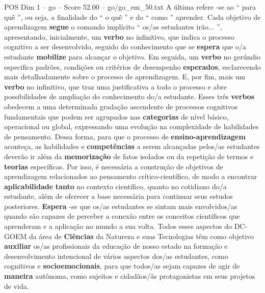 \begin{textsample}{POS Dim 1 – go – Score 52.00 – go/go\_em\_50.txt}
A última refere -se ao “ para quê ”, ou seja, a finalidade do “ o quê ” e do “ como ” aprender.
Cada objetivo de aprendizagem \textbf{segue} o comando implícito “ os/as estudantes irão... ”, apresentando, inicialmente, um \textbf{verbo} no infinitivo, que indica o processo cognitivo a ser desenvolvido, seguido do conhecimento que se \textbf{espera} que o/a estudante \textbf{mobilize} para alcançar o objetivo.
Em seguida, um \textbf{verbo} no gerúndio especifica padrões, condições ou critérios de desempenho \textbf{esperados}, esclarecendo mais detalhadamente sobre o processo de aprendizagem.
E, por fim, mais um \textbf{verbo} no infinitivo, que traz uma justificativa a todo o processo e abre possibilidades de ampliação do conhecimento do/a estudante.
Esses três \textbf{verbos} obedecem a uma determinada gradação ascendente de processos cognitivos fundamentais que podem ser agrupados nas \textbf{categorias} de nível básico, operacional ou global, expressando uma evolução na complexidade de habilidades de pensamento.
Dessa forma, para que o processo de \textbf{ensino-aprendizagem} aconteça, as habilidades e \textbf{competências} a serem alcançadas pelos/as estudantes deverão ir além da \textbf{memorização} de fatos isolados ou da repetição de termos e \textbf{teorias} específicas.
Por isso, é necessária a construção de objetivos de aprendizagem relacionados ao pensamento crítico-científico, de modo a encontrar \textbf{aplicabilidade} \textbf{tanto} no contexto científico, quanto no cotidiano do/a estudante, além de oferecer a base necessária para continuar seus estudos posteriores. \textbf{Espera} -se que os/as estudantes se sintam mais envolvidos/as quando são capazes de perceber a conexão entre os conceitos científicos que aprenderam e a aplicação no mundo a sua volta.
Todos esses aspectos do DC-GOEM da área de \textbf{Ciências} da Natureza e suas Tecnologias têm como objetivo \textbf{auxiliar} os/as profissionais da educação de nosso estado na formação e desenvolvimento intencional de vários aspectos dos/as estudantes, como cognitivos e \textbf{socioemocionais}, para que todos/as sejam capazes de agir de \textbf{maneira} autônoma, como sujeitos e cidadãos/ãs protagonistas em seus projetos de vida.

\end{textsample}
